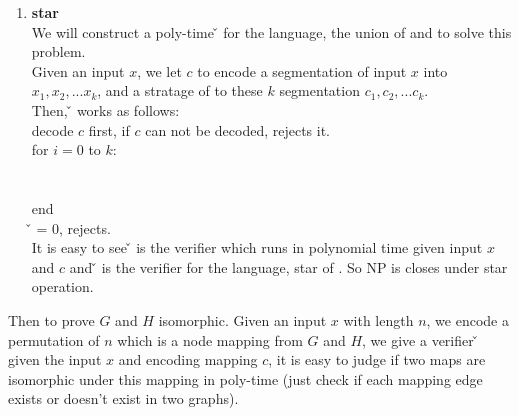 \documentclass[11pt]{article}
\newcommand{\itab}[1]{\hspace{0em}\rlap{#1}}
\newcommand{\tab}[1]{\hspace{1em}\rlap{#1}}
\begin{document}
\begin{enumerate}
\item {\bf star} \\
    We will construct a poly-time \v{} for the language, the union of 
    \lf{} and \ls{} to solve this problem.\\
    Given an input $x$, we let $c$ to encode a segmentation of input $x$ into 
    $x_{1},x_{2},...x_{k}$, and a stratage of \vf{} to these $k$ segmentation $c_{1},c_{2},...c_{k}$. \\
    Then, \v{} works as follows: \\
    decode $c$ first, if $c$ can not be decoded, rejects it. \\
    for $i = 0$ to $k$: \\
    \itab{} \tab{if $V_{1}(x_{i},c_{i})$ == 1:} \\
    \itab{} \tab{} \tab{\v{} = 1, accepts} \\
    end \\
    \v{} = 0, rejects.\\
    It is easy to see \v{} is the verifier which runs in polynomial time 
    given input $x$ and $c$ and \v{} is the verifier for the language, star of \lf{}. So NP is closes under star operation. 
\end{enumerate} 
Then to prove $G$ and $H$ isomorphic. Given an input $x$ with length $n$, we encode a permutation of $n$ which is a node mapping from $G$ and $H$, 
we give a verifier \v{} given the input $x$ and encoding mapping $c$, it is easy to judge if two maps are isomorphic under this mapping in poly-time 
(just check if each mapping edge exists or doesn't exist in two graphs).
\end{document}
